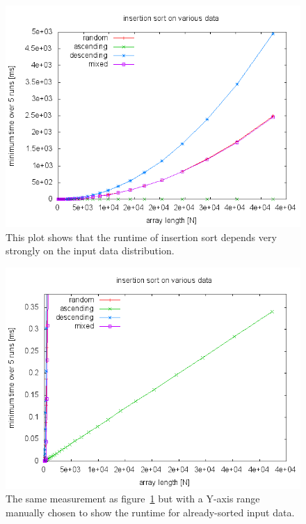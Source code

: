 \documentclass[a4paper,10pt]{article}
\begin{document}
\begin{figure}
  \centering
  \includegraphics[width=0.8\columnwidth]{../examples/isort-idep.png}
  \caption{
    This plot shows that the runtime of insertion sort depends very strongly on the input data distribution.
  }\label{fig:isort-idep}
\end{figure}

\begin{figure}
  \centering
  \includegraphics[width=0.8\columnwidth]{../examples/isort-idep-asc.png}
  \caption{
    The same measurement as figure~\ref{fig:isort-idep} but with a Y-axis range manually chosen to show the runtime for already-sorted input data.
  }\label{fig:isort-idep-asc}
\end{figure}
\end{document}
